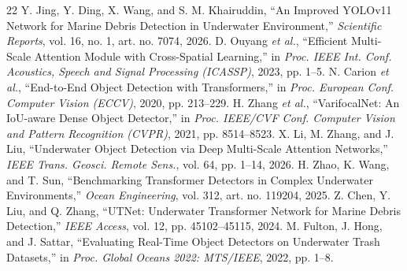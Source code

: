 \documentclass[conference]{IEEEtran}
\begin{document}
\begin{thebibliography}{22}
 Y. Jing, Y. Ding, X. Wang, and S. M. Khairuddin, ``An Improved YOLOv11 Network for Marine Debris Detection in Underwater Environment,'' \emph{Scientific Reports}, vol. 16, no. 1, art. no. 7074, 2026.
 D. Ouyang \emph{et al.}, ``Efficient Multi-Scale Attention Module with Cross-Spatial Learning,'' in \emph{Proc. IEEE Int. Conf. Acoustics, Speech and Signal Processing (ICASSP)}, 2023, pp. 1--5.
 N. Carion \emph{et al.}, ``End-to-End Object Detection with Transformers,'' in \emph{Proc. European Conf. Computer Vision (ECCV)}, 2020, pp. 213--229.
 H. Zhang \emph{et al.}, ``VarifocalNet: An IoU-aware Dense Object Detector,'' in \emph{Proc. IEEE/CVF Conf. Computer Vision and Pattern Recognition (CVPR)}, 2021, pp. 8514--8523.
 X. Li, M. Zhang, and J. Liu, ``Underwater Object Detection via Deep Multi-Scale Attention Networks,'' \emph{IEEE Trans. Geosci. Remote Sens.}, vol. 64, pp. 1--14, 2026.
 H. Zhao, K. Wang, and T. Sun, ``Benchmarking Transformer Detectors in Complex Underwater Environments,'' \emph{Ocean Engineering}, vol. 312, art. no. 119204, 2025.
 Z. Chen, Y. Liu, and Q. Zhang, ``UTNet: Underwater Transformer Network for Marine Debris Detection,'' \emph{IEEE Access}, vol. 12, pp. 45102--45115, 2024.
 M. Fulton, J. Hong, and J. Sattar, ``Evaluating Real-Time Object Detectors on Underwater Trash Datasets,'' in \emph{Proc. Global Oceans 2022: MTS/IEEE}, 2022, pp. 1--8.
\end{thebibliography}

\appendices
\end{document}
